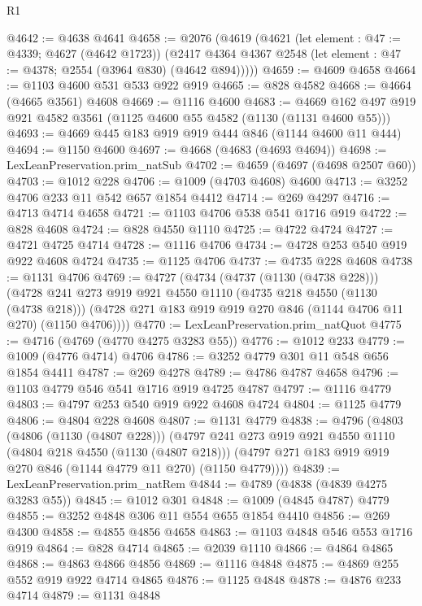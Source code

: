 \begin{lexlean}{R1}
\begin{coremodule}
@4642 := @4638 @4641
@4658 := @2076
    (@4619
      (@4621
        (let element : @47 := @4339; @4627 (@4642 @1723))
        (@2417 @4364 @4367 @2548 (let element : @47 := @4378; @2554 (@3964 @830) (@4642 @894)))))
@4659 := @4609 @4658
@4664 := @1103 @4600 @531 @533 @922 @919
@4665 := @828 @4582
@4668 := @4664 (@4665 @3561) @4608
@4669 := @1116 @4600
@4683 := @4669 @162 @497 @919 @921 @4582 @3561 (@1125 @4600 @55 @4582 (@1130 (@1131 @4600 @55)))
@4693 := @4669 @445 @183 @919 @919 @444 @846 (@1144 @4600 @11 @444)
@4694 := @1150 @4600
@4697 := @4668 (@4683 (@4693 @4694))
@4698 := LexLeanPreservation.prim_natSub
@4702 := @4659 (@4697 (@4698 @2507 @60))
@4703 := @1012 @228
@4706 := @1009 (@4703 @4608) @4600
@4713 := @3252 @4706 @233 @11 @542 @657 @1854 @4412
@4714 := @269 @4297
@4716 := @4713 @4714 @4658
@4721 := @1103 @4706 @538 @541 @1716 @919
@4722 := @828 @4608
@4724 := @828 @4550 @1110
@4725 := @4722 @4724
@4727 := @4721 @4725 @4714
@4728 := @1116 @4706
@4734 := @4728 @253 @540 @919 @922 @4608 @4724
@4735 := @1125 @4706
@4737 := @4735 @228 @4608
@4738 := @1131 @4706
@4769 := @4727
    (@4734
      (@4737 (@1130 (@4738 @228)))
      (@4728
        @241
        @273
        @919
        @921
        @4550
        @1110
        (@4735 @218 @4550 (@1130 (@4738 @218)))
        (@4728 @271 @183 @919 @919 @270 @846 (@1144 @4706 @11 @270) (@1150 @4706))))
@4770 := LexLeanPreservation.prim_natQuot
@4775 := @4716 (@4769 (@4770 @4275 @3283 @55))
@4776 := @1012 @233
@4779 := @1009 (@4776 @4714) @4706
@4786 := @3252 @4779 @301 @11 @548 @656 @1854 @4411
@4787 := @269 @4278
@4789 := @4786 @4787 @4658
@4796 := @1103 @4779 @546 @541 @1716 @919 @4725 @4787
@4797 := @1116 @4779
@4803 := @4797 @253 @540 @919 @922 @4608 @4724
@4804 := @1125 @4779
@4806 := @4804 @228 @4608
@4807 := @1131 @4779
@4838 := @4796
    (@4803
      (@4806 (@1130 (@4807 @228)))
      (@4797
        @241
        @273
        @919
        @921
        @4550
        @1110
        (@4804 @218 @4550 (@1130 (@4807 @218)))
        (@4797 @271 @183 @919 @919 @270 @846 (@1144 @4779 @11 @270) (@1150 @4779))))
@4839 := LexLeanPreservation.prim_natRem
@4844 := @4789 (@4838 (@4839 @4275 @3283 @55))
@4845 := @1012 @301
@4848 := @1009 (@4845 @4787) @4779
@4855 := @3252 @4848 @306 @11 @554 @655 @1854 @4410
@4856 := @269 @4300
@4858 := @4855 @4856 @4658
@4863 := @1103 @4848 @546 @553 @1716 @919
@4864 := @828 @4714
@4865 := @2039 @1110
@4866 := @4864 @4865
@4868 := @4863 @4866 @4856
@4869 := @1116 @4848
@4875 := @4869 @255 @552 @919 @922 @4714 @4865
@4876 := @1125 @4848
@4878 := @4876 @233 @4714
@4879 := @1131 @4848

\end{coremodule}
\end{lexlean}
